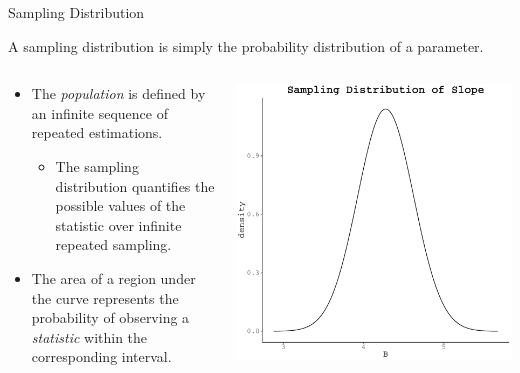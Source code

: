 \documentclass[10pt]{beamer}\usepackage[]{graphicx}\usepackage[]{color}
\makeatletter
\def\maxwidth{ %
  \ifdim\Gin@nat@width>\linewidth
    \linewidth
  \else
    \Gin@nat@width
  \fi
}
\newenvironment{knitrout}{}{} %
\makeatother
\begin{document}
\begin{frame}[shrink = 5]{Sampling Distribution}

  A sampling distribution is simply the probability distribution of a parameter.

  \begin{columns}
    \begin{column}{0.5\textwidth}

      \begin{itemize}
      \item The \emph{population} is defined by an infinite sequence of repeated
        estimations.
        \vb
        \begin{itemize}
        \item The sampling distribution quantifies the possible values of the
          statistic over infinite repeated sampling.
        \end{itemize}
        \vb
      \item The area of a region under the curve represents the probability of
        observing a \emph{statistic} within the corresponding interval.
      \end{itemize}

    \end{column}
    \begin{column}{0.5\textwidth}

\begin{knitrout}\footnotesize
{}\color{fgcolor}

{\centering \includegraphics[width=\maxwidth]{figure/unnamed-chunk-10-1} 

}
\end{knitrout}
\end{column}
\end{columns}
\end{frame}
\end{document}

